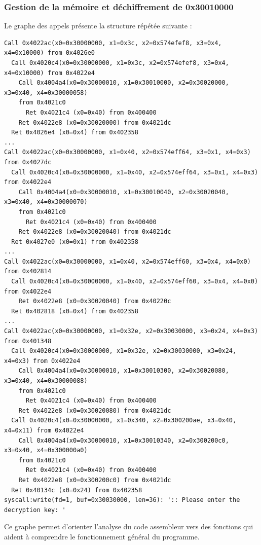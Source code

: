 \documentclass[a4paper,10pt]{article}
\begin{document}
\subsubsection{Gestion de la mémoire et déchiffrement de 0x30010000}
\label{arm64decrypt}

Le graphe des appels présente la structure répétée suivante :
\begin{verbatim}
Call 0x4022ac(x0=0x30000000, x1=0x3c, x2=0x574efef8, x3=0x4, x4=0x10000) from 0x4026e0
  Call 0x4020c4(x0=0x30000000, x1=0x3c, x2=0x574efef8, x3=0x4, x4=0x10000) from 0x4022e4
    Call 0x4004a4(x0=0x30000010, x1=0x30010000, x2=0x30020000, x3=0x40, x4=0x30000058)
    from 0x4021c0
      Ret 0x4021c4 (x0=0x40) from 0x400400
    Ret 0x4022e8 (x0=0x30020000) from 0x4021dc
  Ret 0x4026e4 (x0=0x4) from 0x402358
...
Call 0x4022ac(x0=0x30000000, x1=0x40, x2=0x574eff64, x3=0x1, x4=0x3) from 0x4027dc
  Call 0x4020c4(x0=0x30000000, x1=0x40, x2=0x574eff64, x3=0x1, x4=0x3) from 0x4022e4
    Call 0x4004a4(x0=0x30000010, x1=0x30010040, x2=0x30020040, x3=0x40, x4=0x30000070)
    from 0x4021c0
      Ret 0x4021c4 (x0=0x40) from 0x400400
    Ret 0x4022e8 (x0=0x30020040) from 0x4021dc
  Ret 0x4027e0 (x0=0x1) from 0x402358
...
Call 0x4022ac(x0=0x30000000, x1=0x40, x2=0x574eff60, x3=0x4, x4=0x0) from 0x402814
  Call 0x4020c4(x0=0x30000000, x1=0x40, x2=0x574eff60, x3=0x4, x4=0x0) from 0x4022e4
    Ret 0x4022e8 (x0=0x30020040) from 0x40220c
  Ret 0x402818 (x0=0x4) from 0x402358
...
Call 0x4022ac(x0=0x30000000, x1=0x32e, x2=0x30030000, x3=0x24, x4=0x3) from 0x401348
  Call 0x4020c4(x0=0x30000000, x1=0x32e, x2=0x30030000, x3=0x24, x4=0x3) from 0x4022e4
    Call 0x4004a4(x0=0x30000010, x1=0x30010300, x2=0x30020080, x3=0x40, x4=0x30000088)
    from 0x4021c0
      Ret 0x4021c4 (x0=0x40) from 0x400400
    Ret 0x4022e8 (x0=0x30020080) from 0x4021dc
  Call 0x4020c4(x0=0x30000000, x1=0x340, x2=0x300200ae, x3=0x40, x4=0x11) from 0x4022e4
    Call 0x4004a4(x0=0x30000010, x1=0x30010340, x2=0x300200c0, x3=0x40, x4=0x300000a0)
    from 0x4021c0
      Ret 0x4021c4 (x0=0x40) from 0x400400
    Ret 0x4022e8 (x0=0x300200c0) from 0x4021dc
  Ret 0x40134c (x0=0x24) from 0x402358
syscall:write(fd=1, buf=0x30030000, len=36): ':: Please enter the decryption key: '
\end{verbatim}

Ce graphe permet d'orienter l'analyse du code assembleur vers des fonctions qui aident à comprendre le fonctionnement général du programme.
\end{document}
